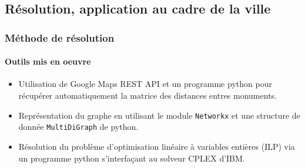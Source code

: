 \documentclass[10pt]{beamer}
\begin{document}
\begin{frame}


\end{frame} 

\subsection{Résolution, application au cadre de la ville}

\begin{frame}
    \frametitle{Méthode de résolution}
    \framesubtitle{Outils mis en oeuvre}
\begin{itemize}
	\item Utilisation de Google Maps REST API et un programme python pour récupérer automatiquement la matrice des distances entres monuments.
	\item Représentation du graphe en utilisant le module \texttt{Networkx} et une structure de donnée \texttt{MultiDiGraph} de python.
	\item Résolution du problème d'optimisation linéaire à variables entières (ILP) via un programme python s'interfaçant au solveur CPLEX d'IBM.
\end{itemize}

\end{frame}
  
\end{document}
